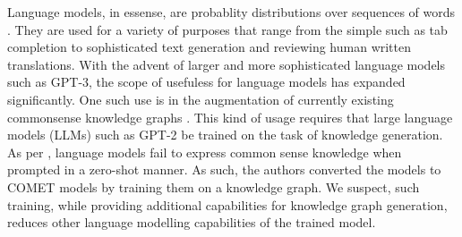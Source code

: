 \documentclass[\main/thesis.tex]{subfiles}
\begin{document}
Language models, in essense, are probablity distributions over sequences of words \cite{jurafsky_speech_2009}. 
They are used for a variety of purposes that range from the simple such as tab completion to 
sophisticated text generation and reviewing human written translations. 
With the advent of larger and more sophisticated language models such as GPT-3\cite{brown_language_2020}, the scope
of usefuless for language models has expanded significantly. One such use is in the 
augmentation of currently existing commonsense knowledge graphs \cite{west_symbolic_2021}.
This kind of usage requires that large language models (LLMs) such as GPT-2 be trained on the task
of knowledge generation. As per \citeauthor{west_symbolic_2021}, language models fail to express common 
sense knowledge when prompted in a zero-shot manner. As such, the authors converted the models
to COMET models by training them on a knowledge graph. We suspect, such training, while providing 
additional capabilities for knowledge graph generation, reduces other language modelling capabilities
of the trained model. 
\end{document}
